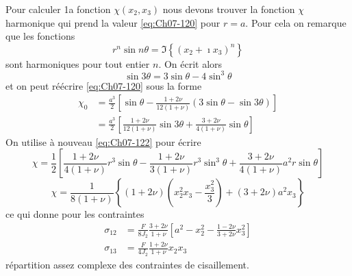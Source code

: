 Pour calculer 1a fonction $\chi (x_2,x_3)$ nous devons trouver la fonction $\chi$ harmonique qui prend la valeur \eqref{eq:Ch07-120} pour $r=a$.
Pour cela on remarque que les fonctions
\begin{equation}
    r^n \sin n \theta = \Im \left\{ \left( x_2 + \imath x_3 \right)^n \right\}
    \label{eq:Ch07-121}
\end{equation}
sont harmoniques pour tout entier $n$.
On écrit alors 
\begin{equation}
    \sin 3 \theta = 3 \sin \theta - 4 \sin^3 \theta
    \label{eq:Ch07-122}
\end{equation}
et on peut réécrire \eqref{eq:Ch07-120} sous la forme 
\begin{equation}
    \begin{aligned}
        \chi_0 &= \frac{a^3}{2} \left[ \sin \theta - \frac{1+2\nu}{12 (1+\nu)} \left( 3 \sin \theta - \sin 3 \theta \right) \right] \\
        &= \frac{a^3}{2} \left[ \frac{1+2\nu}{12(1+\nu)} \sin 3 \theta + \frac{3 + 2\nu}{4(1+\nu)} \sin \theta \right]
    \end{aligned}
    \label{eq:Ch07-123}
\end{equation}
On utilise à nouveau \eqref{eq:Ch07-122} pour écrire
\begin{displaymath}
    \chi = \frac{1}{2} \left[ \frac{1+2\nu}{4(1+\nu)} r^3 \sin \theta - \frac{1+2\nu}{3(1+\nu)} r^3 \sin^3 \theta + \frac{3+2\nu}{4(1+\nu)}a^2 r \sin \theta \right]
\end{displaymath}
\begin{equation}
    \chi = \frac{1}{8(1+\nu)} \left\{ (1+2\nu) \left( x_2^2 x_3 - \frac{x_3^2}{3}\right) + (3+2\nu) a^2 x_3 \right\}
    \label{eq:Ch07-124}
\end{equation}
ce qui donne pour les contraintes 
\begin{equation}
    \begin{aligned}
        \sigma_{12} &= \frac{F}{8J_2} \frac{3+2\nu}{1+\nu} \left[ a^2 - x_2^2 - \frac{1-2\nu}{3+ 2\nu}x_3^2 \right] \\
        \sigma_{13} &= \frac{F}{4J_2} \frac{1+2\nu}{1+\nu} x_2 x_3
    \end{aligned}
    \label{eq:Ch07-125}
\end{equation}
répartition assez complexe des contraintes de cisaillement. 

